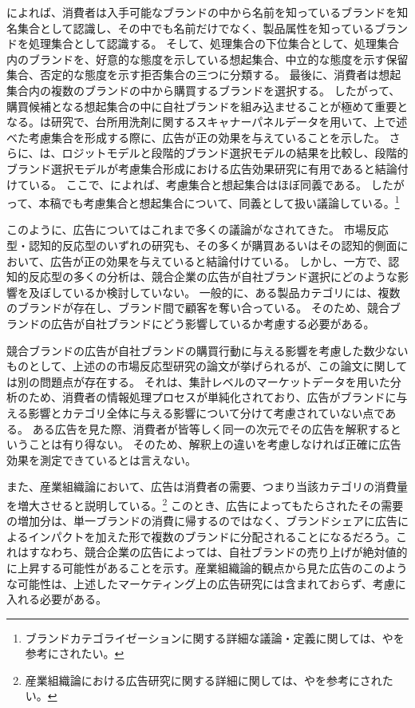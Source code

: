 \documentclass[11pt]{jsarticle}
\begin{document}
\newpage

\citet{brisoux1980}によれば、消費者は入手可能なブランドの中から名前を知っているブランドを知名集合として認識し、その中でも名前だけでなく、製品属性を知っているブランドを処理集合として認識する。
そして、処理集合の下位集合として、処理集合内のブランドを、好意的な態度を示している想起集合、中立的な態度を示す保留集合、否定的な態度を示す拒否集合の三つに分類する。
最後に、消費者は想起集合内の複数のブランドの中から購買するブランドを選択する。
したがって、購買候補となる想起集合の中に自社ブランドを組み込ませることが極めて重要となる。\citet{saito1999}は研究で、台所用洗剤に関するスキャナーパネルデータを用いて、上で述べた考慮集合を形成する際に、広告が正の効果を与えていることを示した。
さらに、\citet{saito1999}は、ロジットモデルと段階的ブランド選択モデルの結果を比較し、段階的ブランド選択モデルが考慮集合形成における広告効果研究に有用であると結論付けている。
ここで、\citet{urano2012}によれば、考慮集合と想起集合はほぼ同義である。
したがって、本稿でも考慮集合と想起集合について、同義として扱い議論している。\footnote{ブランドカテゴライゼーションに関する詳細な議論・定義に関しては、\citet{onzo1995}や\citet{katsumata2011}を参考にされたい。}

このように、広告についてはこれまで多くの議論がなされてきた。
市場反応型・認知的反応型のいずれの研究も、その多くが購買あるいはその認知的側面において、広告が正の効果を与えていると結論付けている。
しかし、一方で、認知的反応型の多くの分析は、競合企業の広告が自社ブランド選択にどのような影響を及ぼしているか検討していない。
一般的に、ある製品カテゴリには、複数のブランドが存在し、ブランド間で顧客を奪い合っている。
そのため、競合ブランドの広告が自社ブランドにどう影響しているか考慮する必要がある。

競合ブランドの広告が自社ブランドの購買行動に与える影響を考慮した数少ないものとして、上述の\citet{shimizu1990}の市場反応型研究の論文が挙げられるが、この論文に関しては別の問題点が存在する。
それは、集計レベルのマーケットデータを用いた分析のため、消費者の情報処理プロセスが単純化されており、広告がブランドに与える影響とカテゴリ全体に与える影響について分けて考慮されていない点である。
ある広告を見た際、消費者が皆等しく同一の次元でその広告を解釈するということは有り得ない。
そのため、解釈上の違いを考慮しなければ正確に広告効果を測定できているとは言えない。

また、産業組織論において、広告は消費者の需要、つまり当該カテゴリの消費量を増大させると説明している。\footnote{産業組織論における広告研究に関する詳細に関しては、\citet{uekusa2013}や\citet{nagaoka2013}を参考にされたい。}
このとき、広告によってもたらされたその需要の増加分は、単一ブランドの消費に帰するのではなく、ブランドシェアに広告によるインパクトを加えた形で複数のブランドに分配されることになるだろう。これはすなわち、競合企業の広告によっては、自社ブランドの売り上げが絶対値的に上昇する可能性があることを示す。産業組織論的観点から見た広告のこのような可能性は、上述したマーケティング上の広告研究には含まれておらず、考慮に入れる必要がある。
\end{document}
